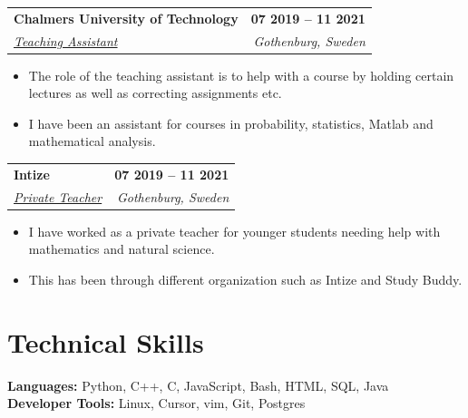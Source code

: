 \documentclass[letterpaper,11pt]{article}
\makeatletter
\newcommand{\entry}[5][]{%
  \begin{tabular*}{\textwidth}[t]{@{}l@{\extracolsep{\fill}}r@{}}
    {\large\bfseries #2} & {\small\bfseries #3}\\
    {\large\itshape #1#4} & {\small\itshape #5}\\
  \end{tabular*}\par\vspace{1.6pt}}
\newenvironment{bullets}{\begin{itemize}[leftmargin=24.1pt,labelsep=5.47pt,label=$\vcenter{\hbox{\tiny$\bullet$}}$,topsep=0pt,itemsep=0pt,parsep=0pt,partopsep=0pt]}{\end{itemize}\vspace{3.5pt}}
\makeatother
\begin{document}
\entry{Chalmers University of Technology}{07 2019 -- 11 2021}{\underline{Teaching Assistant}}{Gothenburg, Sweden}
\begin{bullets}
  \item The role of the teaching assistant is to help with a course by holding certain lectures as well as correcting assignments etc.
  \item I have been an assistant for courses in probability, statistics, Matlab and mathematical analysis.
\end{bullets}
\entry{Intize}{07 2019 -- 11 2021}{\underline{Private Teacher}}{Gothenburg, Sweden}
\begin{bullets}
  \item I have worked as a private teacher for younger students needing help with mathematics and natural science.
  \item This has been through different organization such as Intize and Study Buddy.
\end{bullets}

\section{Technical Skills}
\vspace{1.25pt}\hspace*{10.8pt}\textbf{Languages:} Python, C++, C, JavaScript, Bash, HTML, SQL, Java\\[-1.6pt]
\hspace*{10.8pt}\textbf{Developer Tools:} Linux, Cursor, vim, Git, Postgres

\newpage
\vspace*{-22.92pt}
\end{document}
